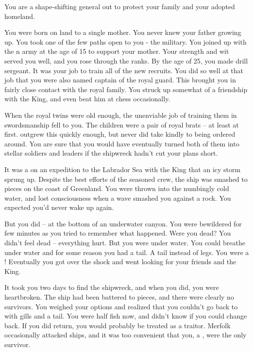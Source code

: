 \documentclass[char]{NeptuneBall}
\begin{document}
\name{\cGeneral{}}



You are a shape-shifting general out to protect your family and your adopted homeland.

You were born on land to a single mother. You never knew your father growing up. You took one of the few paths open to you - the military. You joined up with the \pAmerica{}n army at the age of 15 to support your mother. Your strength and wit served you well, and you rose through the ranks. By the age of 25, you made drill sergeant. It was your job to train all of the new recruits. You did so well at that job that you were also named captain of the royal guard. This brought you in fairly close contact with the royal family. You struck up somewhat of a friendship with the King, and even beat him at chess occasionally.

When the royal twins were old enough, the unenviable job of training them in swordsmanship fell to you. The children were a pair of royal brats -- at least at first. \cEric{} outgrew this quickly enough, but \cSlave{} never did take kindly to being ordered around. You are sure that you would have eventually turned both of them into stellar soldiers and leaders if the shipwreck hadn't cut your plans short.

It was a on an expedition to the Labrador Sea with the King that an icy storm sprung up. Despite the best efforts of the seasoned crew, the ship was smashed to pieces on the coast of Greenland. You were thrown into the numbingly cold water, and lost consciousness when a wave smashed you against a rock.  You expected you'd never wake up again.

But you did -- at the bottom of an underwater canyon. You were bewildered for few minutes as you tried to remember what happened. Were you dead? You didn't feel dead -- everything hurt. But you were under water. You could breathe under water and for some reason you had a tail. A tail instead of legs. You were a \cGeneral{\mer}! Eventually you got over the shock and went looking for your friends and the King.

It took you two days to find the shipwreck, and when you did, you were heartbroken. The ship had been battered to pieces, and there were clearly no survivors. You  weighed your options and realized that you couldn't go back to \pAmerica{} with gills and a tail. You were half fish now, and didn't know if you could change back. If you did return, you would probably be treated as a traitor. Merfolk occasionally attacked ships, and it was too convenient that you, a \cGeneral{\mer}, were the only survivor.
\end{document}
